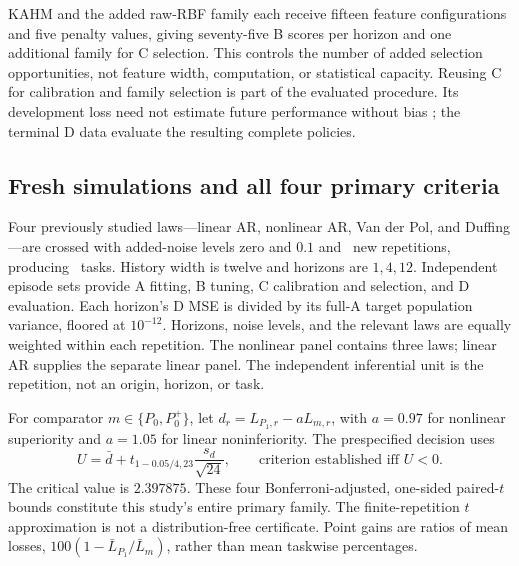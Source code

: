 KAHM and the added raw-RBF family each receive fifteen feature
configurations and five penalty values, giving seventy-five B scores per
horizon and one additional family for C selection. This controls the
number of added selection opportunities, not feature width, computation,
or statistical capacity. Reusing C for calibration and family selection
is part of the evaluated procedure. Its development loss need not
estimate future performance without bias \citep{Cawley2010Selection};
the terminal D data evaluate the resulting complete policies.

\subsection{Fresh simulations and all four primary criteria}

Four previously studied laws---linear AR, nonlinear AR, Van der Pol, and
Duffing---are crossed with added-noise levels zero and $0.1$ and
\PARepetitions\ new repetitions, producing \PATasks\ tasks. History
width is twelve and horizons are $1,4,12$. Independent episode sets
provide A fitting, B tuning, C calibration and selection, and D
evaluation. Each horizon's D MSE is divided by its full-A target
population variance, floored at $10^{-12}$. Horizons, noise levels, and
the relevant laws are equally weighted within each repetition. The
nonlinear panel contains three laws; linear AR supplies the separate
linear panel. The independent inferential unit is the repetition,
not an origin, horizon, or task.

\begin{table}[t]
\centering\small
\caption{Complete policy losses in the fresh simulation study. Each
entry averages the \PARepetitions\ repetition-level standardized MSEs
(SMSEs). The nonlinear and linear panels are analyzed separately.}
\label{supp:pa-policy}

\end{table}

For comparator $m\in\{P_0,P_0^+\}$, let
$d_r=L_{P_1,r}-aL_{m,r}$, with $a=0.97$ for nonlinear superiority and
$a=1.05$ for linear noninferiority. The prespecified decision uses
\begin{equation}
 U=\bar d+t_{1-0.05/4,23}\frac{s_d}{\sqrt{24}},
 \qquad \text{criterion established iff }U<0.
 \label{eq:supp-pa-inference}
\end{equation}
The critical value is $2.397875$. These four Bonferroni-adjusted,
one-sided paired-$t$ bounds constitute this study's entire primary
family. The finite-repetition $t$ approximation is not a distribution-free
certificate. Point gains are ratios of mean losses,
$100(1-\bar L_{P_1}/\bar L_m)$, rather than mean taskwise percentages.

